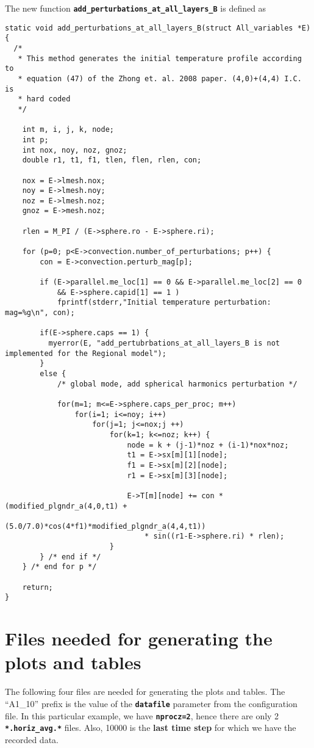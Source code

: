 \documentclass[10pt]{article}
\begin{document}
The new function \texttt{\textbf{add\_perturbations\_at\_all\_layers\_B}} is defined as 
\begin{verbatim}
static void add_perturbations_at_all_layers_B(struct All_variables *E)
{
  /*
   * This method generates the initial temperature profile according to 
   * equation (47) of the Zhong et. al. 2008 paper. (4,0)+(4,4) I.C. is
   * hard coded
   */

    int m, i, j, k, node;
    int p;
    int nox, noy, noz, gnoz;
    double r1, t1, f1, tlen, flen, rlen, con;

    nox = E->lmesh.nox;
    noy = E->lmesh.noy;
    noz = E->lmesh.noz;
    gnoz = E->mesh.noz;

    rlen = M_PI / (E->sphere.ro - E->sphere.ri);

    for (p=0; p<E->convection.number_of_perturbations; p++) {
        con = E->convection.perturb_mag[p];

        if (E->parallel.me_loc[1] == 0 && E->parallel.me_loc[2] == 0
            && E->sphere.capid[1] == 1 )
            fprintf(stderr,"Initial temperature perturbation:  mag=%g\n", con);

        if(E->sphere.caps == 1) {
          myerror(E, "add_pertubrbations_at_all_layers_B is not implemented for the Regional model");
        }
        else {
            /* global mode, add spherical harmonics perturbation */

            for(m=1; m<=E->sphere.caps_per_proc; m++)
                for(i=1; i<=noy; i++)
                    for(j=1; j<=nox;j ++)
                        for(k=1; k<=noz; k++) {
                            node = k + (j-1)*noz + (i-1)*nox*noz;
                            t1 = E->sx[m][1][node];
                            f1 = E->sx[m][2][node];
                            r1 = E->sx[m][3][node];

                            E->T[m][node] += con * (modified_plgndr_a(4,0,t1) + 
                                (5.0/7.0)*cos(4*f1)*modified_plgndr_a(4,4,t1))
                                * sin((r1-E->sphere.ri) * rlen);
                        }
        } /* end if */
    } /* end for p */

    return;
}
\end{verbatim}

\section*{Files needed for generating the plots and tables}
The following four files are needed for generating the plots and tables. The ``A1\_10'' prefix is the value of the 
\textbf{\texttt{datafile}} parameter from the configuration file. In this particular example, we have
\textbf{\texttt{nprocz=2}}, hence there are only 2 \textbf{\texttt{*.horiz\_avg.*}} files. Also, 10000 is the 
\textbf{last time step} for which we have the recorded data.
\end{document}

